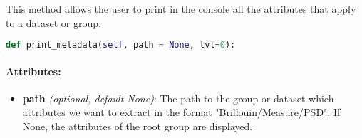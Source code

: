 This method allows the user to print in the console all the attributes that apply to a dataset or group.

\begin{lstlisting}[language=Python]
def print_metadata(self, path = None, lvl=0):
\end{lstlisting}

\paragraph{Attributes:}
\begin{itemize}
    \item \textbf{path} \textit{(optional, default None)}: The path to the group or dataset which attributes we want to extract in the format "Brillouin/Measure/PSD". If None, the attributes of the root group are displayed.
\end{itemize}
